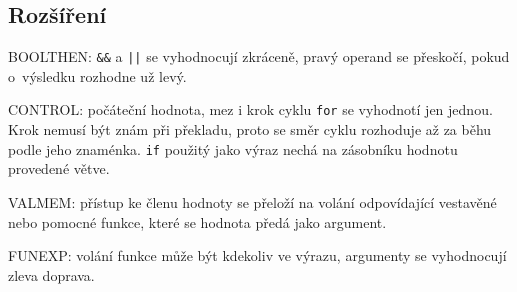 \subsection{Rozšíření}
BOOLTHEN: \texttt{\&\&} a \texttt{||} se vyhodnocují zkráceně, pravý
operand se přeskočí, pokud o~výsledku rozhodne už levý.

CONTROL: počáteční hodnota, mez i krok cyklu \texttt{for} se vyhodnotí
jen jednou. Krok nemusí být znám při překladu, proto se směr cyklu
rozhoduje až za běhu podle jeho znaménka. \texttt{if} použitý jako výraz
nechá na zásobníku hodnotu provedené větve.

VALMEM: přístup ke členu hodnoty se přeloží na volání odpovídající
vestavěné nebo pomocné funkce, které se hodnota předá jako argument.

FUNEXP: volání funkce může být kdekoliv ve výrazu, argumenty se
vyhodnocují zleva doprava.
